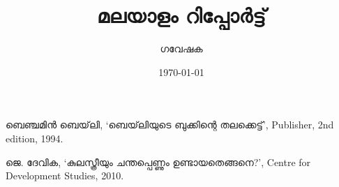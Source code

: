 \documentclass[11pt]{report}
\title{മലയാളം റിപ്പോർട്ട്}
\author{ഗവേഷക}
\date{\today}
\begin{document}




 

\tableofcontents









\begin{thebibliography}{99} 

 ബെഞ്ചമിൻ ബെയ്‌ലി,   `ബെയ്‌ലിയുടെ ബുക്കിന്റെ തലക്കെട്ട്',   Publisher,   2nd edition,   1994.

ജെ. ദേവിക, `കുലസ്ത്രീയും ചന്തപ്പെണ്ണും ഉണ്ടായതെങ്ങനെ?',  Centre for Development Studies, 2010.

\end{thebibliography}
\end{document}

